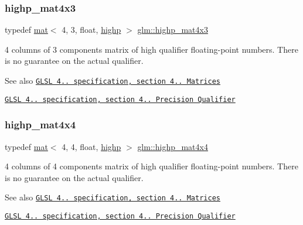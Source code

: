 \subsubsection{\texorpdfstring{highp\+\_\+mat4x3}{highp\_mat4x3}}
{\footnotesize\ttfamily typedef \hyperlink{structglm_1_1mat}{mat}$<$ 4, 3, float, \hyperlink{namespaceglm_a36ed105b07c7746804d7fdc7cc90ff25ac6f7eab42eacbb10d59a58e95e362074}{highp} $>$ \hyperlink{group__core__precision_ga20620a62fd7d4e020e772c4d258cf2e4}{glm\+::highp\+\_\+mat4x3}}

4 columns of 3 components matrix of high qualifier floating-\/point numbers. There is no guarantee on the actual qualifier.

\begin{DoxySeeAlso}{See also}
\href{http://www.opengl.org/registry/doc/GLSLangSpec.4.20.8.pdf}{\tt G\+L\+SL 4.. specification, section 4.. Matrices} 

\href{http://www.opengl.org/registry/doc/GLSLangSpec.4.20.8.pdf}{\tt G\+L\+SL 4.. specification, section 4.. Precision Qualifier} 
\end{DoxySeeAlso}
\mbox{\label{group__core__precision_ga93c7db376e7b0bd24ef4947667468c9a}} 
\subsubsection{\texorpdfstring{highp\+\_\+mat4x4}{highp\_mat4x4}}
{\footnotesize\ttfamily typedef \hyperlink{structglm_1_1mat}{mat}$<$ 4, 4, float, \hyperlink{namespaceglm_a36ed105b07c7746804d7fdc7cc90ff25ac6f7eab42eacbb10d59a58e95e362074}{highp} $>$ \hyperlink{group__core__precision_ga93c7db376e7b0bd24ef4947667468c9a}{glm\+::highp\+\_\+mat4x4}}

4 columns of 4 components matrix of high qualifier floating-\/point numbers. There is no guarantee on the actual qualifier.

\begin{DoxySeeAlso}{See also}
\href{http://www.opengl.org/registry/doc/GLSLangSpec.4.20.8.pdf}{\tt G\+L\+SL 4.. specification, section 4.. Matrices} 

\href{http://www.opengl.org/registry/doc/GLSLangSpec.4.20.8.pdf}{\tt G\+L\+SL 4.. specification, section 4.. Precision Qualifier} 
\end{DoxySeeAlso}
\mbox{\label{group__core__precision_gabfd1cf11193324a5f77d3831b6ac3205}} 
